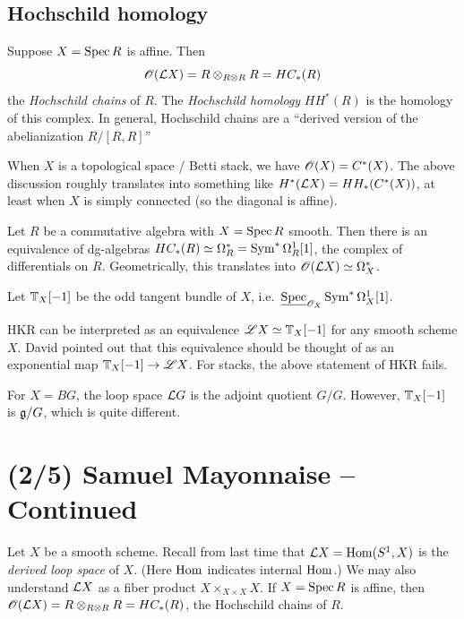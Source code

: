 \documentclass{article}
\begin{document}
\subsection{Hochschild homology}

Suppose $X = \operatorname{Spec} R$ is affine.
Then 
\[
  \mathscr{O}(\mathcal{L} X) = R \otimes_{R \otimes R} R = HC_*(R)
\]
the \emph{Hochschild chains} of $R$.
The \emph{Hochschild homology} $HH^*(R)$ is the homology of this complex.
In general, Hochschild chains are a ``derived version of the abelianization $R / [R, R]$''

\begin{rmk}
  When $X$ is a topological space / Betti stack, we have $\mathscr{O}(X) = C^*(X)$.
  The above discussion roughly translates into something like $H^*(\mathcal{L} X) = HH_*(C^*(X))$, at least when $X$ is simply connected (so the diagonal is affine).
\end{rmk}

\begin{thm}
  Let $R$ be a commutative algebra with $X = \operatorname{Spec} R$ smooth.
  Then there is an equivalence of dg-algebras $HC_*(R) \simeq \Omega^*_R = \operatorname{Sym}^* \Omega^1_R[1]$, the complex of differentials on $R$.
  Geometrically, this translates into $\mathscr{O}(\mathcal{L} X) \simeq \Omega^*_X$.
\end{thm}

\begin{dfn}
  Let $\mathbb{T}_X[-1]$ be the odd tangent bundle of $X$, i.e.\ $\underline{\operatorname{Spec}}_{\mathscr{O}_X} \operatorname{Sym}^* \Omega^1_X[1]$.
\end{dfn}

HKR can be interpreted as an equivalence $\mathscr{L} X \simeq \mathbb{T}_X[-1]$ for any smooth scheme $X$.
David pointed out that this equivalence should be thought of as an exponential map $\mathbb{T}_X[-1] \to \mathscr{L} X$.
For stacks, the above statement of HKR fails.

\begin{ex}
  For $X = BG$, the loop space $\mathcal{L} G$ is the adjoint quotient $G / G$.
  However, $\mathbb{T}_X[-1]$ is $\mathfrak{g} / G$, which is quite different.
\end{ex}

\section{(2/5) Samuel Mayonnaise -- Continued}

Let $X$ be a smooth scheme.
Recall from last time that $\mathcal{L} X = \operatorname{Hom}(S^1, X)$ is the \emph{derived loop space} of $X$.
(Here $\operatorname{Hom}$ indicates internal $\operatorname{Hom}$.)
We may also understand $\mathcal{L} X$ as a fiber product $X \times_{X \times X} X$.
If $X = \operatorname{Spec} R$ is affine, then $\mathscr{O}(\mathcal{L} X) = R \otimes_{R \otimes R} R = HC_*(R)$, the Hochschild chains of $R$.
\end{document}
